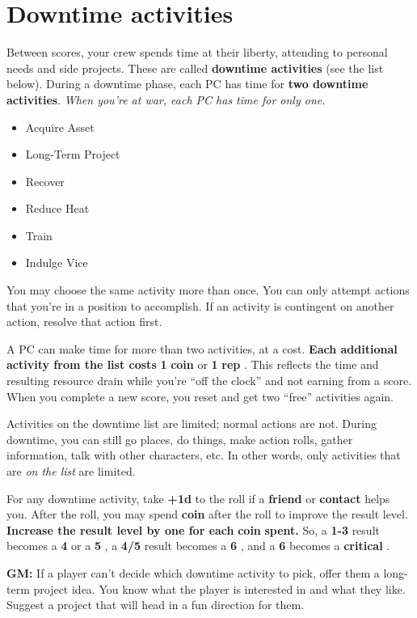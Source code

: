 \documentclass[11pt,fleqn,a5paper]{book}
\newcommand{\gameterm}[1]{\textbf{#1}}
\begin{document}
\chapter{Downtime activities}

Between scores, your crew spends time at their liberty, attending to personal needs and side projects. These are called \textbf{downtime activities} (see the list below). During a downtime phase, each PC has time for \textbf{two downtime activities}. \emph{When you’re at war, each PC has time for only one.}

\begin{itemize}
	\item Acquire Asset
	\item Long-Term Project
	\item Recover
	\item Reduce Heat
	\item Train
	\item Indulge Vice
\end{itemize}

You may choose the same activity more than once. You can only attempt actions that you’re in a position to accomplish. If an activity is contingent on another action, resolve that action first.

A PC can make time for more than two activities, at a cost. \textbf{Each additional activity from the list costs} \textbf{1} \gameterm{coin}  or \textbf{1} \gameterm{rep} . This reflects the time and resulting resource drain while you’re “off the clock” and not earning from a score. When you complete a new score, you reset and get two “free” activities again.

Activities on the downtime list are limited; normal actions are not. During downtime, you can still go places, do things, make action rolls, gather information, talk with other characters, etc. In other words, only activities that are \emph{on the list} are limited.

For any downtime activity, take \textbf{+1d} to the roll if a \textbf{friend} or \textbf{contact} helps you. After the roll, you may spend \gameterm{coin}  after the roll to improve the result level. \textbf{Increase the result level by one for each }\gameterm{coin} \textbf{ spent.} So, a \gameterm{1-3}  result becomes a \gameterm{4}  or a \gameterm{5} , a \gameterm{4/5}  result becomes a \gameterm{6} , and a \gameterm{6}  becomes a \gameterm{critical} .

\textbf{GM:} If a player can’t decide which downtime activity to pick, offer them a long-term project idea. You know what the player is interested in and what they like. Suggest a project that will head in a fun direction for them.
\end{document}
